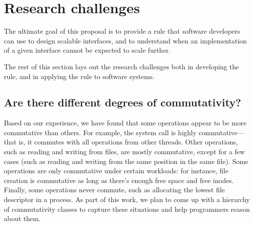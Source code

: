 \section{Research challenges}
\label{sec:research}

The ultimate goal of this proposal is to provide a rule that software
developers
can use to design scalable interfaces, and to understand when an
implementation of a given interface cannot be expected to scale
further.
\begin{comment}
There are a number of challenges in providing such a rule.  First,
the rule must be precise and intuitive to help developers make clear
decisions.  Second, the rule must capture how an interface might scale
under different workloads, which we hope to represent using a hierarchy
of scalability classes.  Third, the rule should capture scalability on
real hardware.  Finally, the programmer should be able to check whether
their implementation achieves the goal set out by the commutativity rule.

To evaluate whether our commutativity rule is meaningful for systems
software, we will apply the rule to both existing systems with rich
interfaces, such as Linux, and to new systems that we build, which will
give us the freedom to choose more commutative (and thus more scalable)
APIs and to quickly explore different implementations.
\end{comment}
The rest of this section lays out the research challenges both in
developing the rule, and in applying the rule to software systems.


\subsection{Are there different degrees of commutativity?}

Based on our experience, we have found that some operations appear to
be more commutative than others.  For example, the  system call
is highly commutative---that is, it commutes with all operations
from other threads.  Other operations, such as reading and writing from
files, are mostly commutative, except for a few cases (such as reading
and writing from the same position in the same file).  Some operations
are only commutative under certain workloads: for instance, file creation
is commutative as long as there's enough free space and free inodes.
Finally, some operations never commute, such as allocating the lowest
file descriptor in a process.  As part of this work, we plan to come up
with a hierarchy of commutativity classes to capture these situations
and help programmers reason about them.


